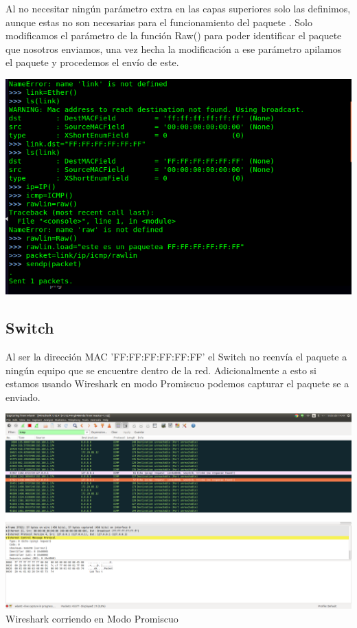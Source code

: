 \documentclass[spanish]{udpreport}
\begin{document}
Al no necesitar ningún parámetro extra en las capas superiores solo las definimos, aunque estas no son necesarias para el funcionamiento del paquete . Solo modificamos el parámetro de la función Raw() para poder identificar el paquete que nosotros enviamos, una vez hecha la modificación a ese parámetro apilamos el paquete y procedemos el envío de este.

\begin{center}
	\includegraphics[scale=.37]{imagenes/Switch/Test_1b.png}
\end{center}

\pagebreak

\subsection{Switch}

Al ser la dirección MAC 'FF:FF:FF:FF:FF:FF' el Switch no reenvía el paquete a ningún equipo que se encuentre dentro de la red. Adicionalmente a esto si estamos usando Wireshark en modo Promiscuo podemos capturar el paquete se a enviado.

\begin{center}
	\includegraphics[scale=.21]{imagenes/Switch/FF.png}
	\\ Wireshark corriendo en Modo Promiscuo
\end{center}
\end{document}
